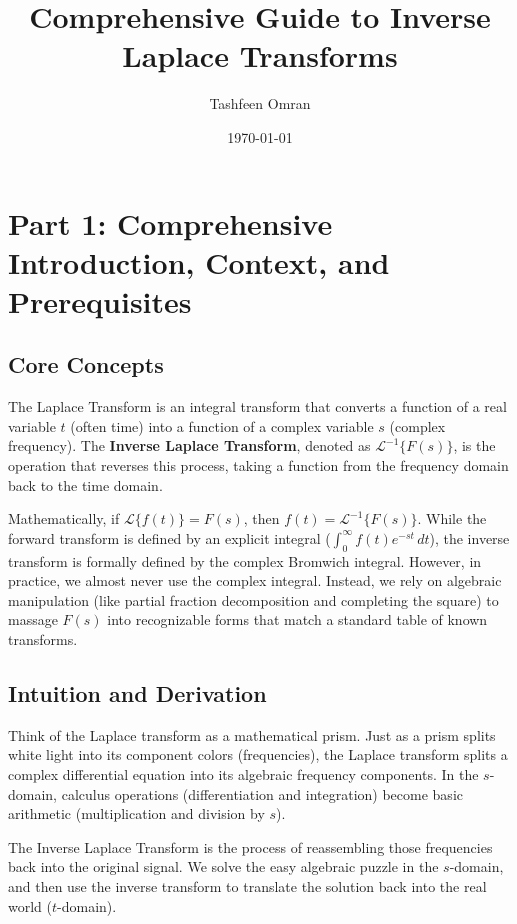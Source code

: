 \documentclass[11pt, a4paper]{article}
\title{\textbf{Comprehensive Guide to Inverse Laplace Transforms}}
\author{Tashfeen Omran}
\date{\today}
\theoremstyle{definition}
\theoremstyle{remark}
\newcommand{\Laplace}{\mathcal{L}}
\newcommand{\InvLaplace}{\mathcal{L}^{-1}}
\begin{document}
\maketitle
\tableofcontents
\newpage

\section{Part 1: Comprehensive Introduction, Context, and Prerequisites}

\subsection{Core Concepts}
The Laplace Transform is an integral transform that converts a function of a real variable $t$ (often time) into a function of a complex variable $s$ (complex frequency). The \textbf{Inverse Laplace Transform}, denoted as $\InvLaplace\{F(s)\}$, is the operation that reverses this process, taking a function from the frequency domain back to the time domain. 

Mathematically, if $\Laplace\{f(t)\} = F(s)$, then $f(t) = \InvLaplace\{F(s)\}$. While the forward transform is defined by an explicit integral ($\int_0^\infty f(t)e^{-st} \, dt$), the inverse transform is formally defined by the complex Bromwich integral. However, in practice, we almost never use the complex integral. Instead, we rely on algebraic manipulation (like partial fraction decomposition and completing the square) to massage $F(s)$ into recognizable forms that match a standard table of known transforms.

\subsection{Intuition and Derivation}
Think of the Laplace transform as a mathematical prism. Just as a prism splits white light into its component colors (frequencies), the Laplace transform splits a complex differential equation into its algebraic frequency components. In the $s$-domain, calculus operations (differentiation and integration) become basic arithmetic (multiplication and division by $s$). 

The Inverse Laplace Transform is the process of reassembling those frequencies back into the original signal. We solve the easy algebraic puzzle in the $s$-domain, and then use the inverse transform to translate the solution back into the real world ($t$-domain).
\end{document}
